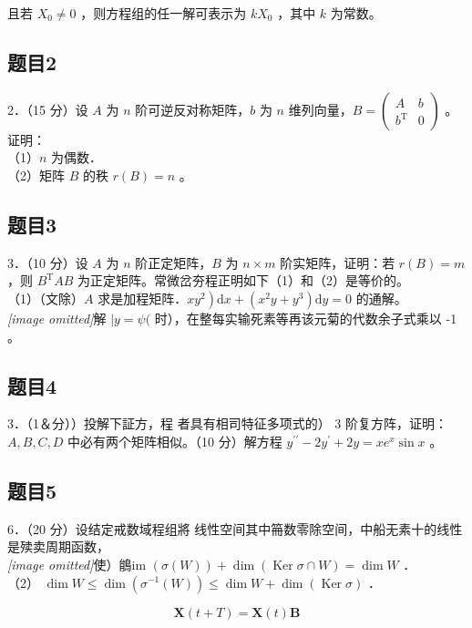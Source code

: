\documentclass{article}
\begin{document}
且若 \(X_{0} \neq 0\) ，则方程组的任一解可表示为 \(k X_{0}\) ，其中 \(k\) 为常数。\\

\subsection{题目2}
2．（15 分）设 \(A\) 为 \(n\) 阶可逆反对称矩阵，\(b\) 为 \(n\) 维列向量，\(B=\left(\begin{array}{cc}A & b \\ b^{\mathrm{T}} & 0\end{array}\right)\) 。证明：\\
（1）\(n\) 为偶数．\\
（2）矩阵 \(B\) 的秩 \(r(B)=n\) 。\\

\subsection{题目3}
3．（10 分）设 \(A\) 为 \(n\) 阶正定矩阵，\(B\) 为 \(n \times m\) 阶实矩阵，证明：若 \(r(B)=m\) ，则 \(B^{\mathrm{T}} A B\) 为正定矩阵。常微岔夯程正明如下（1）和（2）是等价的。\\
（1）（文除）\(A\) 求是加程矩阵．\(\left.x y^{2}\right) \mathrm{d} x+\left(x^{2} y+y^{3}\right) \mathrm{d} y=0\) 的通解。\\
\textit{[image omitted]}解 \(\mid y=\psi(\) 时），在整每实输死素等再该元菊的代数余子式乘以 -1 。\\

\subsection{题目4}
3．（1＆分））投解下証方，程 者具有相司特征多项式的） 3 阶复方阵，证明：\(A, B, C, D\) 中必有两个矩阵相似。（10 分）解方程 \(y^{\prime \prime}-2 y^{\prime}+2 y=x e^{x} \sin x\) 。\\

\subsection{题目5}
6．（20 分）设结定戒数域程组將 线性空间其中笧数零除空间，中船无素十的线性是㱩卖周期函数，\\
\textit{[image omitted]}使）䳌im \((\sigma(W))+\operatorname{dim}(\operatorname{Ker} \sigma \cap W)=\operatorname{dim} W\) ．\\
（2） \(\operatorname{dim} W \leq \operatorname{dim}\left(\sigma^{-1}(W)\right) \leq \operatorname{dim} W+\operatorname{dim}(\operatorname{Ker} \sigma)\) ．

\[
\mathbf{X}(t+T)=\mathbf{X}(t) \mathbf{B}
\]
\end{document}
